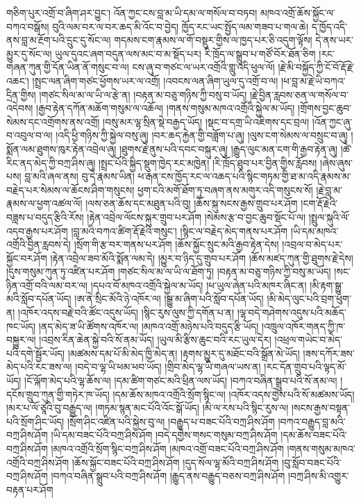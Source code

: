 \documentclass{article}
\begin{document}
གཅིག་པུར་འགྲོ་བ་ཞིག་ཤར་བྱུང་། འོན་ཀྱང་ངས་བླ་མ་ཡི་དམ་ལ་གསོལ་བ་བཏབ། མཁའ་འགྲོ་ཆོས་སྐྱོང་ལ་བཀའ་བསྒོས། བུའི་ལམ་བར་ལ་བར་ཆད་མི་འོང་བ་བྱེད། ཁྱོད་རང་ཡང་སྤྱོད་ལམ་གཟབ་པ་གལ་ཆེ། ད་ཁྱོད་འདི་ནས་བླ་མ་རྔོག་པའི་དྲུང་དུ་སོང་ལ། གདམས་ངག་རྣམས་ལ་གོ་བསྡུར་གྱིས་ལ་ཁྱད་པར་ཅི་འདུག་ལྟོས། དེ་ནས་ཡར་མྱུར་དུ་སོང་ལ། ཡུལ་དུའང་ཞག་བདུན་ལས་མང་བ་མ་སྡོད་པར། རི་ཁྲོད་ལ་སྒྲུབ་པ་གཙོ་བོར་ཐོན་ཅིག །རང་གཞན་ཀུན་གྱི་དོན་ཡིན་ནོ་གསུང་བ་ལ། ངས་ཞུ་བ་གཙང་ལ་ཡར་འགྲོའི་གླུ་འདི་ཕུལ་ལོ། །རྗེ་མི་བསྐྱོད་ཀྱི་ངོ་བོ་རྡོ་རྗེ་འཆང་། །སྤྲང་ལན་ཞིག་གཙང་ཕྱོགས་ཡར་ལ་འགྲོ། །འབངས་ལན་ཞིག་ཡུལ་དུ་འགྲོ་བ་ལ། །ཕ་བླ་མ་རྗེ་ཡི་བཀའ་དྲིན་གྱིས། །གཙང་སིལ་མ་ལ་ཡི་ལ་རྩེ་ན། །བརྟན་མ་བཅུ་གཉིས་ཀྱི་བསུ་བ་ཡོད། །རྗེ་བྱིན་རླབས་ཅན་ལ་གསོལ་བ་འདེབས། །རྒྱབ་རྟེན་དཀོན་མཆོག་གསུམ་ལ་འཆོལ། །གནས་གསུམ་མཁའ་འགྲོའི་སྐྱེལ་མ་ཡོད། །གྲོགས་བྱང་ཆུབ་སེམས་དང་འགྲོགས་ནས་འགྲོ། །བསུ་མར་ལྷ་སྲིན་སྡེ་བརྒྱད་ཡོད། །སྡང་བ་དགྲ་ཡི་འཇིགས་དང་བྲལ། །འོན་ཀྱང་ཞུ་བ་འབུལ་བ་ལ། །འདི་ཕྱི་གཉིས་ཀྱི་སྐྱེལ་བསུ་ཞུ། །བར་ཆད་རྐྱེན་གྱི་བཟློག་པ་ཞུ། །ལུས་ངག་སེམས་ལ་བསྲུང་བ་ཞུ། །སྨོན་ལམ་ཐུགས་ཁུར་རྟེན་འབྲེལ་ཞུ། །ཐུགས་རྗེ་ནུས་པའི་དབང་བསྐུར་ཞུ། །རྒྱུད་ལུང་མན་ངག་གི་རྒྱབ་རྟེན་ཞུ། །ཚེ་རིང་ནད་མེད་ཀྱི་བཀྲ་ཤིས་ཞུ། །སྤྲང་པོའི་སྐྱིད་སྡུག་ཁྱེད་རང་མཁྱེན། །རི་ཁྲོད་ཐུབ་པར་བྱིན་གྱིས་རློབས། །ཞེས་ཞུས་པས། བླ་མའི་ཞལ་ནས། བུ་དེ་རྣམས་ཡིན། ཕ་རྒན་ངས་ཁྱོད་རང་ལ་འཆད་པའི་སྙིང་གཏམ་གྱི་ཐ་མ་འདི་རྣམས་མ་བརྗེད་པར་སེམས་ལ་ཆོངས་ཤིག་གསུངས། ཕྱག་ངའི་མགོ་ཐོག་ཏུ་བཞག་ནས་མགུར་འདི་གསུངས་སོ། །རྗེ་བླ་མ་རྣམས་ལ་ཕྱག་འཚལ་ལོ། །ལས་ཅན་ཆོས་དང་མཐུན་པའི་བུ། །ཆོས་སྐུ་སངས་རྒྱས་གྲུབ་པར་ཤོག །ངག་རྡོ་རྗེའི་བཟླས་པ་བདུད་རྩིའི་རོས། །རྟེན་འབྲེལ་ལོངས་སྐུར་གྲུབ་པར་ཤོག །སེམས་རྩ་བ་བྱང་ཆུབ་སྡོང་པོ་ལ། །སྤྲུལ་སྐུའི་ལོ་འདབ་རྒྱས་པར་ཤོག །བླ་མའི་བཀའ་ཚིག་རྡོ་རྗེའི་གསུང་། །སྙིང་ལ་བརྗེད་མེད་གནས་པར་ཤོག །ཡི་དམ་མཁའ་འགྲོའི་བྱིན་རླབས་དེ། །སྲོག་གི་རྩ་བར་གནས་པར་ཤོག །ཆོས་སྐྱོང་སྲུང་མའི་རྒྱབ་རྟེན་དེས། །འབྲལ་བ་མེད་པར་སྐྱོང་བར་ཤོག །རྟེན་འབྲེལ་ཟབ་མོའི་སྨོན་ལམ་དེ། །མྱུར་བ་ཉིད་དུ་གྲུབ་པར་ཤོག །ཆོས་མཛད་ཀུན་གྱི་ཐུགས་རྗེ་དེས། །དུས་གསུམ་ཀུན་ཏུ་འཛིན་པར་ཤོག །གཙང་སིལ་མ་ལ་ཡི་ལ་ཐོག་ཏུ། །བརྟན་མ་བཅུ་གཉིས་ཀྱི་བསུ་མ་ཡོད། །སང་ཉིན་འགྲོ་བའི་ལམ་བར་ལ། །དཔའ་བོ་མཁའ་འགྲོའི་སྐྱེལ་མ་ཡོད། །ཕ་ཡུལ་ཞེན་པའི་མཁར་ཞིང་ན། །མི་རྟག་སྒྱུ་མའི་སློབ་དཔོན་ཡོད། །ཨ་ནེ་སྲིང་མོའི་ཉེ་འཁོར་ལ། །སྒྱུ་མ་ཞིག་པའི་སློབ་དཔོན་ཡོད། །མི་མེད་ལུང་པའི་བྲག་ཕུག་ན། །འཁོར་འདས་བརྗེ་བའི་ཚོང་འདུས་ཡོད། །སྙིང་རུས་ལུས་ཀྱི་དགོན་པ་ན། །ལྷ་བདེ་གཤེགས་འདུས་པའི་མཆོད་ཁང་ཡོད། །ནད་མེད་ཟ་ཡི་ཚོགས་འཁོར་ལ། །མཁའ་འགྲོ་མཉེས་པའི་བདུད་རྩི་ཡོད། །འཁྲུལ་འཁོར་གནད་ཀྱི་ཁ་བསྐྱུར་ལ། །འབྲས་རིན་ཆེན་སྐྱེ་བའི་སོ་ནམ་ཡོད། །ཡུལ་མི་རྩིས་ཆུང་བའི་རང་ཡུལ་དེར། །འཕྲལ་གཡེང་བ་མེད་པའི་དགེ་སྦྱོར་ཡོད། །མཚམས་དམ་པོ་མི་མེད་ཁྱི་མེད་ན། །རྟགས་མྱུར་དུ་མཐོང་བའི་སྒྲོན་མེ་ཡོད། །ཟས་དཀོར་ཟས་མེད་པའི་རང་ཟས་ལ། །བདེ་བ་ལྷ་ཡི་ཕམ་ཕབ་ཡོད། །གྲིབ་མེད་ལྷ་ཡི་གཞལ་ཡས་ན། །རང་དོན་གྲུབ་པའི་ལྟད་མོ་ཡོད། །ངོ་ལྐོག་མེད་པའི་ལྷ་ཆོས་ལ། །དམ་ཚིག་གཙང་མའི་ཕྲིན་ལས་ཡོད། །བཀའ་བཞིན་སྒྲུབ་པའི་སོ་ནམ་ལ། །དངོས་གྲུབ་ཀུན་གྱི་གཏེར་ཁ་ཡོད། །དམ་ཆོས་མཁའ་འགྲོའི་སྲོག་སྙིང་ལ། །འཁོར་འདས་གྱེས་པའི་སོ་མཚམས་ཡོད། །མར་པ་ལོ་ཙཱའི་བུ་བརྒྱུད་ལ། །གཏམ་སྙན་མང་པོའི་འོང་སྒོ་ཡོད། །མི་ལ་རས་པའི་སྙིང་རུས་ལ། །སངས་རྒྱས་བསྟན་པའི་སྲོག་ཤིང་ཡོད། །སྲོག་ཤིང་འཛིན་པའི་སྐྱེས་བུ་ལ། །བརྒྱུད་པ་བཟང་པོའི་བཀྲ་ཤིས་ཤོག །བཀའ་བརྒྱུད་བླ་མའི་བཀྲ་ཤིས་ཤོག །ཡི་དམ་བཟང་པོའི་བཀྲ་ཤིས་ཤོག །བདེ་དགྱེས་གསང་གསུམ་བཀྲ་ཤིས་ཤོག །དམ་ཆོས་བཟང་པོའི་བཀྲ་ཤིས་ཤོག །མཁའ་འགྲོའི་སྲོག་སྙིང་བཀྲ་ཤིས་ཤོག །མཁའ་འགྲོ་བཟང་པོའི་བཀྲ་ཤིས་ཤོག །གནས་གསུམ་མཁའ་འགྲོའི་བཀྲ་ཤིས་ཤོག །ཆོས་སྐྱོང་བཟང་པོའི་བཀྲ་ཤིས་ཤོག །དུད་སོལ་ལྷ་མོའི་བཀྲ་ཤིས་ཤོག །བུ་སློབ་བཟང་པོའི་བཀྲ་ཤིས་ཤོག །བཀའ་བཞིན་སྒྲུབ་པའི་བཀྲ་ཤིས་ཤོག །རྒྱུད་ནས་བརྒྱུད་བཅས་བཀྲ་ཤིས་ཤོག །བཀྲ་ཤིས་མི་འགྱུར་བརྟན་པར་ཤོག 
\end{document}
